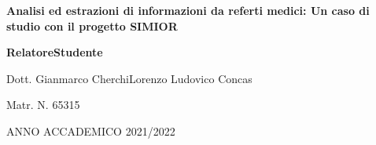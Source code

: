 \vspace{2.6cm}


\begin{center}
\textbf{\LARGE Analisi ed estrazioni di informazioni da referti medici: 
Un caso di studio con il progetto SIMIOR
}\par
\end{center}{\LARGE \par}



\begin{spacing}{0.90}
\vspace{3.7cm}
\textbf{\large Relatore}{\large \hfill{}}\textbf{\large Studente}{\large \par}
\end{spacing}

{\large Dott. Gianmarco Cherchi\hfill{}Lorenzo Ludovico Concas~}{\large \par}

\begin{spacing}{0.90}
{\large \hfill{}Matr. N. 65315}{\large \par}
\end{spacing}

\vspace{2.5cm}


\begin{center}
ANNO ACCADEMICO 2021/2022\par 
\end{center}
